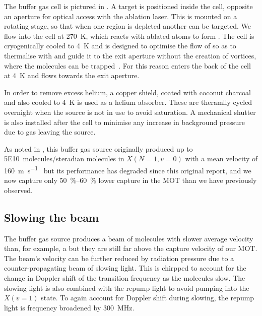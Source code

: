 The buffer gas cell is pictured in . A \Ca{}
target is positioned inside the cell, opposite an aperture for optical access
with the ablation laser. This is mounted on a rotating stage, so that when one
region is depleted another can be targeted. We flow \SFsix{} into the cell at
\SI{270}{\kelvin}, which reacts with ablated \Ca{} atoms to form \CaF{}. The
cell is cryogenically cooled to \SI{4}{\kelvin} and is designed to optimise the
flow of \He{} so as to thermalise with \CaF{} and guide it to the exit aperture
without the creation of vortices, where the molecules can be
trapped~\cite{Truppe2018}. For this reason \He{} enters the back of the cell at
\SI{4}{\kelvin} and flows towards the exit aperture.

\begin{figure}
  \centering
  \caption{}
  \label{overview:fig:source}
\end{figure}

In order to remove excess helium, a copper shield, coated with coconut charcoal
and also cooled to \SI{4}{\kelvin} is used as a helium absorber. These are
theramlly cycled overnight when the source is not in use to avoid saturation.
A mechanical shutter is also installed after the cell to minimise any increase
in background pressure due to \He{} gas leaving the source.

As noted in , this buffer gas source originally
produced up to \SI{5E10}{molecules/steradian} molecules in $X(N=1, v=0)$ with a
mean velocity of \SI{160}{\meter\per\second}~\cite{Truppe2018} but its
performance has degraded since this original report, and we now capture only
\SIrange{50}{60}{\percent} lower capture in the MOT than we have previously
observed.

\subsection*{Slowing the beam}

The buffer gas source produces a beam of molecules with slower average velocity
than, for example, a  but they are still far above the
capture velocity of our MOT. The beam's velocity can be further reduced by
radiation pressure due to a counter-propagating beam of 
slowing light. This is chirpped to account for the change in Doppler shift of the transition
frequency as the molecules slow. The slowing light is also combined with the
 repump light to avoid pumping into the $X(v=1)$ state. To again
account for Doppler shift during slowing, the repump light is frequency
broadened by \SI{300}{\mega\hertz}.

